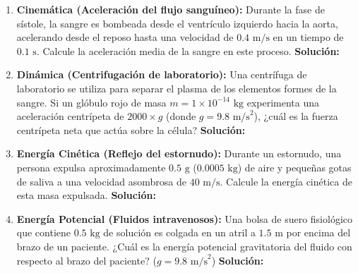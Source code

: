 \documentclass[12pt,letterpaper]{article}
\begin{document}
\begin{enumerate}
    \item \textbf{Cinemática (Aceleración del flujo sanguíneo):} Durante la fase de sístole, la sangre es bombeada desde el ventrículo izquierdo hacia la aorta, acelerando desde el reposo hasta una velocidad de $0.4 \text{ m/s}$ en un tiempo de $0.1 \text{ s}$. Calcule la aceleración media de la sangre en este proceso.
    \textbf{Solución:} \\

    \item \textbf{Dinámica (Centrifugación de laboratorio):} Una centrífuga de laboratorio se utiliza para separar el plasma de los elementos formes de la sangre. Si un glóbulo rojo de masa $m = 1 \times 10^{-14} \text{ kg}$ experimenta una aceleración centrípeta de $2000 \times g$ (donde $g = 9.8 \text{ m/s}^2$), ¿cuál es la fuerza centrípeta neta que actúa sobre la célula?
    \textbf{Solución:} \\

    \item \textbf{Energía Cinética (Reflejo del estornudo):} Durante un estornudo, una persona expulsa aproximadamente $0.5 \text{ g}$ ($0.0005 \text{ kg}$) de aire y pequeñas gotas de saliva a una velocidad asombrosa de $40 \text{ m/s}$. Calcule la energía cinética de esta masa expulsada.
    \textbf{Solución:} \\

    \item \textbf{Energía Potencial (Fluidos intravenosos):} Una bolsa de suero fisiológico que contiene $0.5 \text{ kg}$ de solución es colgada en un atril a $1.5 \text{ m}$ por encima del brazo de un paciente. ¿Cuál es la energía potencial gravitatoria del fluido con respecto al brazo del paciente? ($g = 9.8 \text{ m/s}^2$)
    \textbf{Solución:} \\

\end{enumerate}
\end{document}
